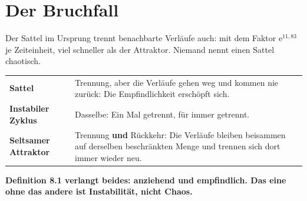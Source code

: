 \section{Der Bruchfall}

\begin{warnung}
Der Sattel im Ursprung trennt benachbarte Verläufe auch: mit dem Faktor $\mathrm e^{11{,}83}$ je Zeiteinheit, viel schneller als der Attraktor. Niemand nennt einen Sattel chaotisch.

\begin{center}
{\small
\renewcommand{\arraystretch}{1.5}
\begin{tabular}{@{}P{2.6cm}P{6.2cm}@{}}
\toprule
\textbf{Sattel} & Trennung, aber die Verläufe gehen weg und kommen nie zurück: Die Empfindlichkeit erschöpft sich.\\
\textbf{Instabiler Zyklus} & Dasselbe: Ein Mal getrennt, für immer getrennt.\\
\textbf{Seltsamer Attraktor} & Trennung \textbf{und} Rückkehr: Die Verläufe bleiben beisammen auf derselben beschränkten Menge und trennen sich dort immer wieder neu.\\
\bottomrule
\end{tabular}}
\end{center}

\begin{center}
\begin{minipage}{0.9\textwidth}
\textbf{Definition 8.1 verlangt beides: anziehend und empfindlich. Das eine ohne das andere ist Instabilität, nicht Chaos.}
\end{minipage}
\end{center}

\begin{center}
\begin{minipage}{0.88\textwidth}
\end{minipage}
\end{center}
\end{warnung}

